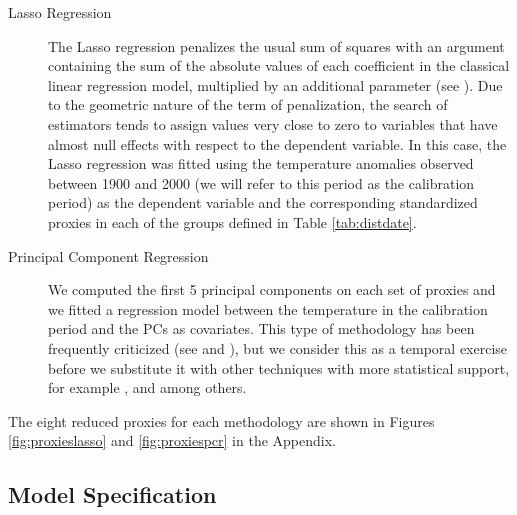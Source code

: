 \documentclass[11pt]{amsart}
\theoremstyle{plain}
\theoremstyle{definition}
\theoremstyle{remark}
\begin{document}
\begin{description}
\item[Lasso Regression]
The Lasso regression penalizes the usual sum of squares with an argument
containing the sum of the absolute values of each coefficient in the classical
linear regression model, multiplied by an additional parameter (see \cite{Tibshirani1996}). Due
to the geometric nature of the term of penalization, the search of estimators
tends to assign values very close to zero to variables that have almost null
effects with respect to the dependent variable. In this case, the Lasso
regression was fitted using the temperature anomalies observed between 1900 and
2000 (we will refer to this period as the calibration period) as the dependent
variable and the corresponding standardized proxies in each of the groups defined in Table \ref{tab:distdate}.
\item[Principal Component Regression]
We computed the first 5 principal components on each set of proxies and we fitted a
regression model between the temperature in the calibration period and the PCs
as covariates. This type of methodology has been frequently criticized (see
\cite{Jolliffe1982} and \cite{Tibshirani1996}),
but we consider this as a temporal exercise before we substitute it with other
techniques with more statistical support, for example \cite{Tibshirani1996},
\cite{Duan1991} and \cite{Li1991} among others. 
\end{description}
The eight reduced proxies for each methodology are shown in Figures
\ref{fig:proxieslasso} and \ref{fig:proxiespcr} in the Appendix.

\subsection{Model Specification}
\label{sec:model}
\end{document}
